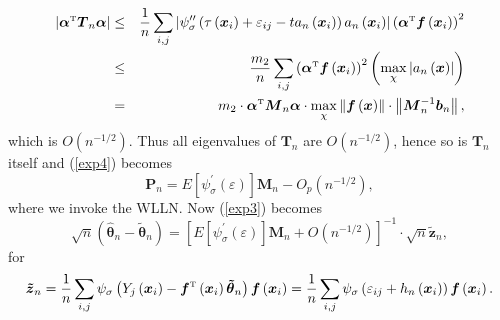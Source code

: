 \documentclass[times, authoryear, 12pt, twoside]{elsarticle}
\begin{document}
\begin{eqnarray*}
\left\vert \boldsymbol{\alpha }^{{\mathrm{\scriptscriptstyle T}}}\boldsymbol{%
T}_{n}\boldsymbol{\alpha }\right\vert  &\leq &\frac{1}{n}\sum_{i,j}\left%
\vert \psi _{\sigma }^{\prime \prime }\left( \tau \left( \boldsymbol{x}%
_{i}\right) +\varepsilon _{ij}-ta_{n}\left( \boldsymbol{x}_{i}\right)
\right) a_{n}\left( \boldsymbol{x}_{i}\right) \right\vert \left( \boldsymbol{%
\alpha }^{{\mathrm{\scriptscriptstyle T}}}\boldsymbol{f}\left( \boldsymbol{x}%
_{i}\right) \right) ^{2} \\
&\leq &\frac{m_{2}}{n}\sum_{i,j}\left( \boldsymbol{\alpha }^{{\mathrm{%
\scriptscriptstyle T}}}\boldsymbol{f}\left( \boldsymbol{x}_{i}\right)
\right) ^{2}\left( \max_{\mathcal{\chi }}\left\vert a_{n}\left( \boldsymbol{x%
}\right) \right\vert \right)  \\
&=&m_{2}\cdot \boldsymbol{\alpha }^{{\mathrm{\scriptscriptstyle T}}}%
\boldsymbol{M}_{n}\boldsymbol{\alpha }\cdot \max_{\mathcal{\chi }%
}\left\Vert \boldsymbol{f}\left( \boldsymbol{x}\right) \right\Vert \cdot
\left\Vert \boldsymbol{M}_{n}^{-1}\boldsymbol{b}_{n}\right\Vert ,
\end{eqnarray*}%
which is $O\left( n^{-1/2}\right) $. Thus all eigenvalues of $\boldsymbol{T}%
_{n}$ are $O\left( n^{-1/2}\right) $, hence so is $\boldsymbol{T}_{n}$
itself and (\ref{exp4}) becomes 
\begin{equation*}
\boldsymbol{P}_{n}=E\left[ \psi
_{\sigma }^{\prime }\left( \varepsilon \right) \right] \boldsymbol{M}%
_{n}-O_p\left( n^{-1/2}\right) ,
\end{equation*}%
where we invoke the WLLN. Now (\ref{exp3})
becomes%
\begin{equation}
\sqrt{n}\left( \boldsymbol{\hat{\theta}}_{n}-\boldsymbol{\tilde{\theta}}%
_{n}\right) =\left[ E\left[ \psi _{\sigma }^{\prime }\left( \varepsilon
\right) \right] \boldsymbol{M}_{n}+O\left( n^{-1/2}\right) \right]
^{-1}\cdot \sqrt{n}\boldsymbol{\tilde{z}}_{n},  \label{exp5}
\end{equation}%
for%
\begin{equation*}
\boldsymbol{\tilde{z}}_{n}=\frac{1}{n}\sum_{i,j}\psi _{\sigma }\left(
Y_{j}\left( \boldsymbol{x}_{i}\right) -\boldsymbol{f}^{{\mathrm{%
\scriptscriptstyle T}}}\left( \boldsymbol{x}_{i}\right) \boldsymbol{\tilde{%
\theta}}_{n}\right) \boldsymbol{f}\left( \boldsymbol{x}_{i}\right) =\frac{1}{%
n}\sum_{i,j}\psi _{\sigma }\left( \varepsilon _{ij}+h_{n}\left( \boldsymbol{x%
}_{i}\right) \right) \boldsymbol{f}\left( \boldsymbol{x}_{i}\right) .
\end{equation*}%
\end{document}
